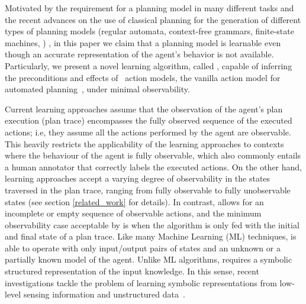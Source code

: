 Motivated by the requirement for a planning model in many different tasks and the recent advances on the use of classical planning for the generation of different types of planning models (regular automata, context-free grammars, finite-state machines, \strips) \cite{bonet2009automatic,segovia2016generalized,segovia2016hierarchical,segovia2017generating}, in this paper we claim that a planning model is learnable even though an accurate representation of the agent's behavior is not available. Particularly, we present a novel learning algorithm, called \FAMA, capable of inferring the preconditions and effects of \strips\ action models, the vanilla action model for automated planning~\cite{fikes1971strips}, under minimal observability.


Current learning approaches assume that the observation of the agent's plan execution (plan trace) encompasses the fully observed sequence of the executed actions; i.e, they assume all the actions performed by the agent are observable. This heavily restricts the applicability of the learning approaches to contexts where the behaviour of the agent is fully observable, which also commonly entails a human annotator that correctly labels the executed actions. On the other hand, learning approaches accept a varying degree of observability in the states traversed in the plan trace, ranging from fully observable to fully unobservable states (see section \ref{related_work} for details). In contrast, \FAMA allows for an incomplete or empty sequence of observable actions, and the minimum observability case acceptable by \FAMA is when the algorithm is only fed with the initial and final state of a plan trace. Like many Machine Learning (ML) techniques, \FAMA is able to operate with only input/output pairs of states and an unknown or a partially known model of the agent. Unlike ML algorithms, \FAMA requires a symbolic structured representation of the input knowledge. In this sense, recent investigations tackle the problem of learning symbolic representations from low-level sensing information and unstructured data~\cite{KonidarisKL18,AsaiF18}.

